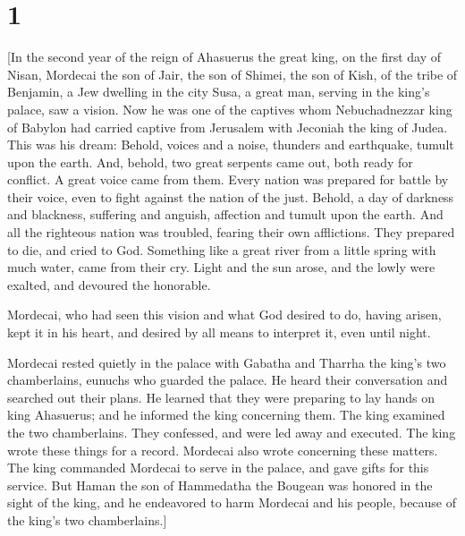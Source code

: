 \hypertarget{section}{%
\section{1}\label{section}}

 {[}In the second year of the reign of Ahasuerus the great
king, on the first day of Nisan, Mordecai the son of Jair, the son of
Shimei, the son of Kish, of the tribe of Benjamin, a Jew dwelling in the
city Susa, a great man, serving in the king's palace, saw a vision. Now
he was one of the captives whom Nebuchadnezzar king of Babylon had
carried captive from Jerusalem with Jeconiah the king of Judea. This was
his dream: Behold, voices and a noise, thunders and earthquake, tumult
upon the earth. And, behold, two great serpents came out, both ready for
conflict. A great voice came from them. Every nation was prepared for
battle by their voice, even to fight against the nation of the just.
Behold, a day of darkness and blackness, suffering and anguish,
affection and tumult upon the earth. And all the righteous nation was
troubled, fearing their own afflictions. They prepared to die, and cried
to God. Something like a great river from a little spring with much
water, came from their cry. Light and the sun arose, and the lowly were
exalted, and devoured the honorable.

Mordecai, who had seen this vision and what God desired to do, having
arisen, kept it in his heart, and desired by all means to interpret it,
even until night.

Mordecai rested quietly in the palace with Gabatha and Tharrha the
king's two chamberlains, eunuchs who guarded the palace. He heard their
conversation and searched out their plans. He learned that they were
preparing to lay hands on king Ahasuerus; and he informed the king
concerning them. The king examined the two chamberlains. They confessed,
and were led away and executed. The king wrote these things for a
record. Mordecai also wrote concerning these matters. The king commanded
Mordecai to serve in the palace, and gave gifts for this service. But
Haman the son of Hammedatha the Bougean was honored in the sight of the
king, and he endeavored to harm Mordecai and his people, because of the
king's two chamberlains.{]}

